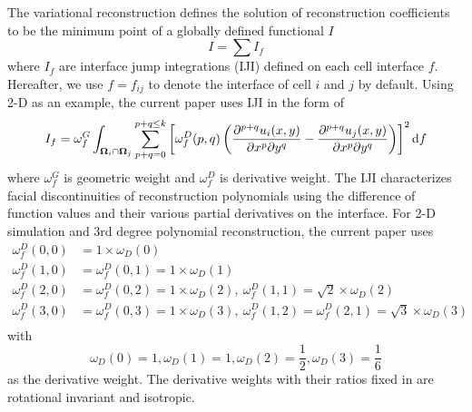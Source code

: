 The variational reconstruction defines the solution of reconstruction coefficients
to be the minimum point of a globally defined functional $I$
\begin{equation}
    I = \sum{I_f}
\end{equation}
where $I_f$ are interface jump integrations (IJI) defined on each cell interface $f$.
Hereafter, we use $f=f_{ij}$ to denote the interface of cell $i$ and $j$ by default.
Using 2-D as an example, the current paper uses IJI in the form of
\begin{equation}
    I_f = \omega_f^G\int_{\OO_i \cap \OO_j}{
        \sum_{p+q=0}^{p + q\leq k}\left[
            \omega_f^D(p,q)
            \left(
            \partialderivative{^{p+q}u_i(x,y)}{x^p\partial y^q}
            -
            \partialderivative{^{p+q}u_j(x,y)}{x^p\partial y^q}
            \right)
            \right]^2
        \dd f
    }
\end{equation}
where $\omega_f^G$ is geometric weight and
$\omega_f^D$ is derivative weight.
The IJI characterizes facial discontinuities of reconstruction polynomials using
the difference of
function values and their various partial derivatives on the interface.
For 2-D simulation and 3rd degree polynomial reconstruction, the current paper uses
\begin{equation}
    \begin{aligned}
        \omega_f^D(0,0) & = 1\times \omega_D(0)                                                                                    \\
        \omega_f^D(1,0) & = \omega_f^D(0,1) = 1\times \omega_D(1)                                                                  \\
        \omega_f^D(2,0) & = \omega_f^D(0,2) = 1\times \omega_D(2),\ \omega_f^D(1,1) = \sqrt{2}\times \omega_D(2)                   \\
        \omega_f^D(3,0) & = \omega_f^D(0,3) = 1\times \omega_D(3),\ \omega_f^D(1,2) = \omega_f^D(2,1) = \sqrt{3}\times \omega_D(3) \\
    \end{aligned}
    \label{eq:wdRotRatio}
\end{equation}
with
\begin{equation}
    \omega_D(0) = 1, \omega_D(1) = 1, \omega_D(2) = \frac{1}{2}, \omega_D(3) = \frac{1}{6}
    \label{eq:wdHQMOPT}
\end{equation}
as the derivative weight.
The derivative weights with their ratios fixed
in  are rotational invariant and
isotropic.

